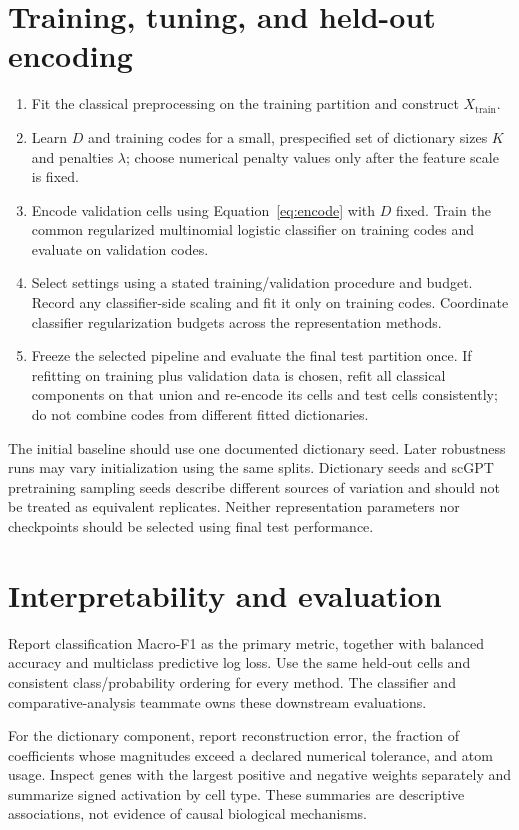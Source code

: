 \documentclass[11pt]{article}
\begin{document}
\section{Training, tuning, and held-out encoding}
\begin{enumerate}
\item Fit the classical preprocessing on the training partition and construct $X_{\mathrm{train}}$.
\item Learn $D$ and training codes for a small, prespecified set of dictionary sizes $K$ and penalties $\lambda$; choose numerical penalty values only after the feature scale is fixed.
\item Encode validation cells using Equation~\eqref{eq:encode} with $D$ fixed. Train the common regularized multinomial logistic classifier on training codes and evaluate on validation codes.
\item Select settings using a stated training/validation procedure and budget. Record any classifier-side scaling and fit it only on training codes. Coordinate classifier regularization budgets across the representation methods.
\item Freeze the selected pipeline and evaluate the final test partition once. If refitting on training plus validation data is chosen, refit all classical components on that union and re-encode its cells and test cells consistently; do not combine codes from different fitted dictionaries.
\end{enumerate}

The initial baseline should use one documented dictionary seed. Later robustness runs may vary initialization using the same splits. Dictionary seeds and scGPT pretraining sampling seeds describe different sources of variation and should not be treated as equivalent replicates. Neither representation parameters nor checkpoints should be selected using final test performance.

\section{Interpretability and evaluation}
Report classification Macro-F1 as the primary metric, together with balanced accuracy and multiclass predictive log loss. Use the same held-out cells and consistent class/probability ordering for every method. The classifier and comparative-analysis teammate owns these downstream evaluations.

For the dictionary component, report reconstruction error, the fraction of coefficients whose magnitudes exceed a declared numerical tolerance, and atom usage. Inspect genes with the largest positive and negative weights separately and summarize signed activation by cell type. These summaries are descriptive associations, not evidence of causal biological mechanisms.
\end{document}
